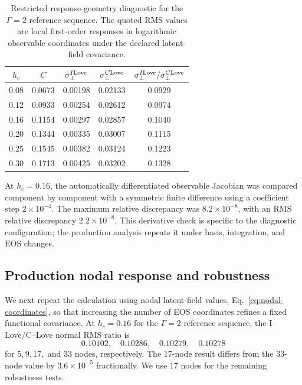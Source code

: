 \begin{table}[b]
\caption{Restricted response-geometry diagnostic for the \(\Gamma=2\) reference sequence. The quoted RMS values are local first-order responses in logarithmic observable coordinates under the declared latent-field covariance.}
\label{tab:pilot-response}
\begin{ruledtabular}
\begin{tabular}{ccccc}
\(h_c\) & \(C\) & \(\sigma_{\perp}^{I{\rm Love}}\) &
\(\sigma_{\perp}^{C{\rm Love}}\) &
\(\sigma_{\perp}^{I{\rm Love}}/\sigma_{\perp}^{C{\rm Love}}\)\\
\hline
0.08 & 0.0673 & 0.00198 & 0.02133 & 0.0929\\
0.12 & 0.0933 & 0.00254 & 0.02612 & 0.0974\\
0.16 & 0.1154 & 0.00297 & 0.02857 & 0.1040\\
0.20 & 0.1344 & 0.00335 & 0.03007 & 0.1115\\
0.25 & 0.1545 & 0.00382 & 0.03124 & 0.1223\\
0.30 & 0.1713 & 0.00425 & 0.03202 & 0.1328
\end{tabular}
\end{ruledtabular}
\end{table}

At \(h_c=0.16\), the automatically differentiated observable Jacobian was compared component by component with a symmetric finite difference using a coefficient step \(2\times10^{-4}\). The maximum relative discrepancy was \(8.2\times10^{-8}\), with an RMS relative discrepancy \(2.2\times10^{-8}\). This derivative check is specific to the diagnostic configuration; the production analysis repeats it under basis, integration, and EOS changes.

\subsection{Production nodal response and robustness}

We next repeat the calculation using nodal latent-field values,
Eq.~\eqref{eq:nodal-coordinates}, so that increasing the number of EOS
coordinates refines a fixed functional covariance.  At \(h_c=0.16\) for the
\(\Gamma=2\) reference sequence, the I--Love/C--Love normal RMS ratio is
\[
0.10102,\quad 0.10286,\quad 0.10279,\quad 0.10278
\]
for \(5,9,17,\) and \(33\) nodes, respectively.  The 17-node result differs
from the 33-node value by \(3.6\times10^{-5}\) fractionally.  We use 17 nodes
for the remaining robustness tests.

